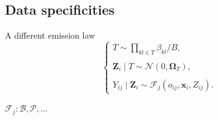 \documentclass[11pt]{beamer}
\newcommand\Omegab{{\boldsymbol{\Omega}}}
\newcommand\xb{{\boldsymbol{x}}}
\newcommand{\Zbf}{{\boldsymbol{Z}}}
\newcommand{\Ncal}{\mathcal{N}}
\begin{document}
 \subsection{Data specificities}
 \begin{frame}{A different emission law}
  \begin{equation*}
 \left\{ \begin{array}{l}
 
 T\sim \prod_{kl\in T} \beta_{kl} / B, \\\\
 \Zbf_i\mid T  \sim \Ncal (0, \Omegab_T), \\\\
 Y_{ij}\mid \Zbf_i\sim \mathcal{F}_j (o_{ij},\xb_i,Z_{ij}).
 \end{array} \right. 
 \end{equation*}
 \bigskip
 
 $\mathcal{F}_j: \mathcal{B}, \mathcal{P}, ...$
 \end{frame}
\end{document}
